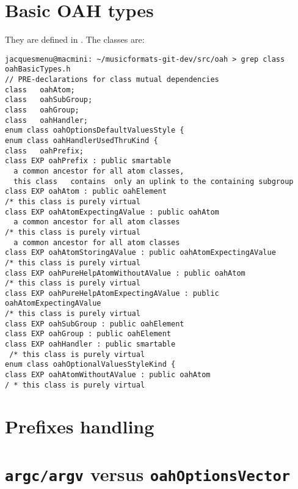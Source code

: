 \section{Basic OAH types}

They are defined in . The classes are:
\begin{lstlisting}[language=Terminal]
jacquesmenu@macmini: ~/musicformats-git-dev/src/oah > grep class   oahBasicTypes.h
// PRE-declarations for class mutual dependencies
class   oahAtom;
class   oahSubGroup;
class   oahGroup;
class   oahHandler;
enum class oahOptionsDefaultValuesStyle {
enum class oahHandlerUsedThruKind {
class   oahPrefix;
class EXP oahPrefix : public smartable
  a common ancestor for all atom classes,
  this class   contains  only an uplink to the containing subgroup
class EXP oahAtom : public oahElement
/* this class is purely virtual
class EXP oahAtomExpectingAValue : public oahAtom
  a common ancestor for all atom classes
/* this class is purely virtual
  a common ancestor for all atom classes
class EXP oahAtomStoringAValue : public oahAtomExpectingAValue
/* this class is purely virtual
class EXP oahPureHelpAtomWithoutAValue : public oahAtom
/* this class is purely virtual
class EXP oahPureHelpAtomExpectingAValue : public oahAtomExpectingAValue
/* this class is purely virtual
class EXP oahSubGroup : public oahElement
class EXP oahGroup : public oahElement
class EXP oahHandler : public smartable
 /* this class is purely virtual
enum class oahOptionalValuesStyleKind {
class EXP oahAtomWithoutAValue : public oahAtom
/ * this class is purely virtual
\end{lstlisting}


\section{Prefixes handling}


\section{{\tt argc/argv} versus {\tt oahOptionsVector}}

